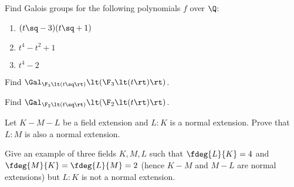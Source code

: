 \documentclass{article}
\begin{document}
\setcounter{section}{6} %
\begin{exercise}
Find Galois groups for the following polynomials $ f $ over $ \Q $:
\end{exercise}
\begin{enumerate}
  \item $ (t\sq-3)(t\sq+1) $
    \begin{solution}

    \end{solution}

  \item $ t^4-t^2+1 $
    \begin{solution}

    \end{solution}

  \item $ t^4-2 $
    \begin{solution}

    \end{solution}
\end{enumerate}
\pagebreak
{}
\begin{subexercise}
  Find $ \Gal_{\F_3\lt(t\sq\rt)}\lt(\F_3\lt(t\rt)\rt) $.
\end{subexercise}
\begin{solution}

\end{solution}
\pagebreak

\begin{subexercise}
  Find $ \Gal_{\F_2\lt(t\sq\rt)}\lt(\F_2\lt(t\rt)\rt) $.
\end{subexercise}
\begin{solution}

\end{solution}
\pagebreak

\begin{subexercise}
  Let $K - M - L$ be a field extension and $ L:K $ is a normal extension.
  Prove that $L:M$ is also a normal extension.
\end{subexercise}
\begin{solution}

\end{solution}
\pagebreak

\begin{subexercise}
  Give an example of three fields $K, M, L$ such that $\fdeg{L}{K} = 4$ and $ \fdeg{M}{K} = \fdeg{L}{M} = 2 $ (hence $ K-M $ and $ M-L $ are normal extensions) but $L : K$ is not a normal extension.
\end{subexercise}
\begin{solution}

\end{solution}
\pagebreak
\end{document}
